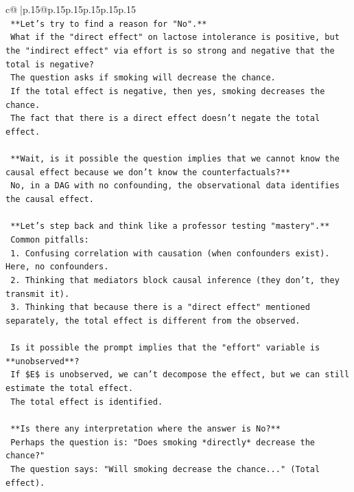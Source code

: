 \documentclass{article}
\begin{document}
{\begin{supertabular}{c@{$\;$}|p{.15\linewidth}@{}p{.15\linewidth}p{.15\linewidth}p{.15\linewidth}p{.15\linewidth}p{.15\linewidth}}
{{{\\ 
\texttt{    **Let's try to find a reason for "No".**} \\
\texttt{    What if the "direct effect" on lactose intolerance is positive, but the "indirect effect" via effort is so strong and negative that the total is negative?} \\
\texttt{    The question asks if smoking will decrease the chance.} \\
\texttt{    If the total effect is negative, then yes, smoking decreases the chance.} \\
\texttt{    The fact that there is a direct effect doesn't negate the total effect.} \\
\\ 
\texttt{    **Wait, is it possible the question implies that we cannot know the causal effect because we don't know the counterfactuals?**} \\
\texttt{    No, in a DAG with no confounding, the observational data identifies the causal effect.} \\
\\ 
\texttt{    **Let's step back and think like a professor testing "mastery".**} \\
\texttt{    Common pitfalls:} \\
\texttt{    1.  Confusing correlation with causation (when confounders exist). Here, no confounders.} \\
\texttt{    2.  Thinking that mediators block causal inference (they don't, they transmit it).} \\
\texttt{    3.  Thinking that because there is a "direct effect" mentioned separately, the total effect is different from the observed.} \\
\\ 
\texttt{    Is it possible the prompt implies that the "effort" variable is **unobserved**?} \\
\texttt{    If \$E\$ is unobserved, we can't decompose the effect, but we can still estimate the total effect.} \\
\texttt{    The total effect is identified.} \\
\\ 
\texttt{    **Is there any interpretation where the answer is No?**} \\
\texttt{    Perhaps the question is: "Does smoking *directly* decrease the chance?"} \\
\texttt{    The question says: "Will smoking decrease the chance..." (Total effect).} \\
}}}
\end{supertabular}}
\end{document}

